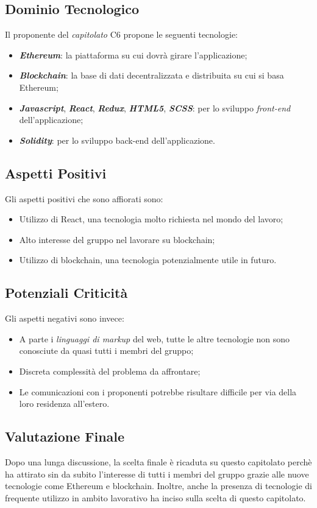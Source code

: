 \subsection{Dominio Tecnologico}
Il proponente del \textit{capitolato} C6 propone le seguenti tecnologie:
\begin{itemize}
	\item \textit{\textbf{Ethereum}}: la piattaforma su cui dovrà girare l'applicazione;
	\item \textit{\textbf{Blockchain}}: la base di dati decentralizzata e distribuita su cui si basa Ethereum;
	\item \textbf{\textit{Javascript}}, \textit{\textbf{React}}, \textit{\textbf{Redux}}, \textbf{\textit{HTML5}}, \textit{\textbf{SCSS}}: 
	per lo sviluppo \textit{front-end} dell'applicazione;
	\item \textit{\textbf{Solidity}}: per lo sviluppo back-end dell'applicazione.
\end{itemize}

\subsection{Aspetti Positivi}
Gli aspetti positivi che sono affiorati sono:
\begin{itemize}
	\item Utilizzo di React, una tecnologia molto richiesta nel mondo del lavoro;
	\item Alto interesse del gruppo nel lavorare su blockchain;
	\item Utilizzo di blockchain, una tecnologia potenzialmente utile in futuro.
\end{itemize}

\subsection{Potenziali Criticità}
Gli aspetti negativi sono invece:
\begin{itemize}
	\item A parte i \textit{linguaggi di markup} del web, tutte le altre tecnologie non sono conosciute da quasi tutti i membri del gruppo;
	\item Discreta complessità del problema da affrontare;
	\item Le comunicazioni con i proponenti potrebbe risultare difficile per via della loro residenza all'estero.
\end{itemize}

\subsection{Valutazione Finale}
Dopo una lunga discussione, la scelta finale è ricaduta su questo capitolato perchè ha attirato sin da subito l'interesse di tutti i membri del gruppo grazie alle nuove tecnologie come Ethereum e blockchain.
Inoltre, anche la presenza di tecnologie di frequente utilizzo in ambito lavorativo ha inciso sulla scelta di questo capitolato.